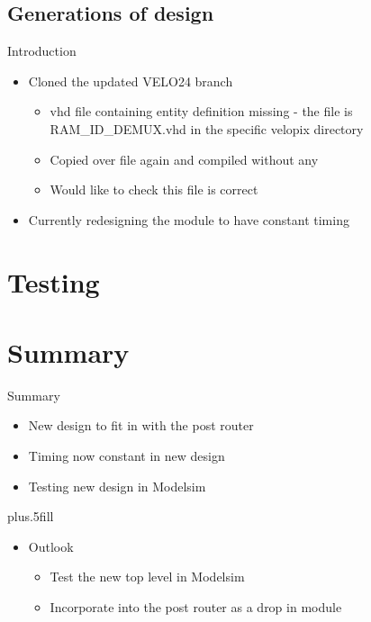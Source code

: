 \documentclass{beamer}
\begin{document}
\subsection{Generations of design}
\begin{frame}{Introduction}
  \begin{itemize}
    \item
      Cloned the updated VELO24 branch
      \begin{itemize}
        \item
          vhd file containing entity definition missing - the file is RAM\_ID\_DEMUX.vhd
          in the specific velopix directory
        \item
          Copied over file again and compiled without any
        \item
          Would like to check this file is correct
      \end{itemize}
    \item
      Currently redesigning the module to have constant timing
    \end{itemize}
\end{frame}

\section{Testing}


\section*{Summary}

\begin{frame}{Summary}

  \begin{itemize}
  \item
    New design to fit in with the post router
  \item
    Timing now constant in new design
  \item
    Testing new design in Modelsim
  \end{itemize}

  \vskip0pt plus.5fill
  \begin{itemize}
  \item
    Outlook
    \begin{itemize}
    \item
      Test the new top level in Modelsim
    \item
      Incorporate into the post router as a drop in module
    \end{itemize}
  \end{itemize}
\end{frame}
\end{document}
